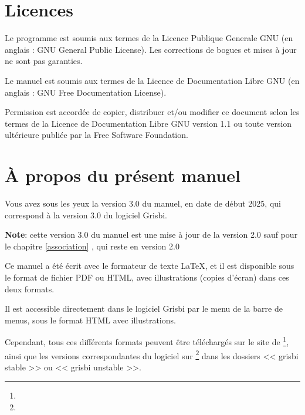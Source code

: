 \section{Licences\label{introduction-licenses}}


Le programme est soumis aux termes de la \gls{Licence Publique Generale GNU} (en anglais : \gls{GNU General Public License}). Les corrections de bogues et mises à jour ne sont pas garanties.

Le manuel est soumis aux termes de la \gls{Licence de Documentation Libre GNU} (en anglais : \gls{GNU Free Documentation License}).

Permission est accordée de copier, distribuer et/ou modifier ce document selon les termes de la Licence de Documentation Libre GNU version 1.1 ou toute version ultérieure publiée par la \gls{Free Software Foundation}.


\section{À propos du présent manuel\label{introduction-manual}}


Vous avez sous les yeux la version \actuality{}3.0 du manuel, en date de \actuality{}début 2025, qui correspond à la version 3.0 du logiciel Grisbi.


\textbf{Note}: cette version 3.0 du manuel est une mise à jour de la version 2.0 sauf pour le chapitre \vref{association} , qui reste en version 2.0 %


Ce manuel a été écrit avec le \gls{formateur de texte} \gls{LaTeX}, et il est disponible sous le \gls{format de fichier} \gls{PDF} ou \gls{HTML}, avec illustrations (copies d'écran) dans ces deux formats. 

Il est accessible directement dans le logiciel Grisbi par le menu  de la barre de menus, sous le format \gls{HTML} avec illustrations.

Cependant, tous ces différents formats peuvent être téléchargés sur le site de \footnote{\urlSourceForgeDocumentation{}}, ainsi que les versions correspondantes du logiciel sur \footnote{\urlSourceForge{}} dans les dossiers << \textsf{grisbi stable} >> ou << \textsf{grisbi unstable} >>.

